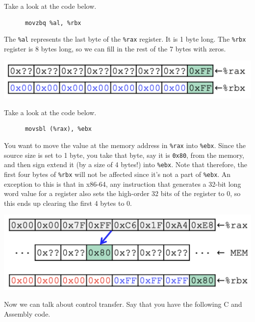   \begin{example}
    Take a look at the code below. 
    \begin{lstlisting}
      movzbq %al, %rbx
    \end{lstlisting}
    The \texttt{\%al} represents the last byte of the \texttt{\%rax} register. It is 1 byte long. The \texttt{\%rbx} register is 8 bytes long, so we can fill in the rest of the 7 bytes with zeros. 
    \begin{center}  
      \includegraphics[scale=0.5]{img/movzbq.png}
    \end{center}
  \end{example}

  \begin{example}
    Take a look at the code below. 
    \begin{lstlisting}
      movsbl (%rax), %ebx
    \end{lstlisting}
    You want to move the value at the memory address in \texttt{\%rax} into \texttt{\%ebx}. Since the source size is set to 1 byte, you take that byte, say it is \texttt{0x80}, from the memory, and then sign extend it (by a size of 4 bytes!) into \texttt{\%ebx}. Note that therefore, the first four bytes of \texttt{\%rbx} will not be affected since it's not a part of \texttt{\%ebx}. An exception to this is that in x86-64, any instruction that generates a 32-bit long word value for a register also sets the high-order 32 bits of the register to 0, so this ends up clearing the first 4 bytes to 0. 
    \begin{center}  
      \includegraphics[scale=0.5]{img/movsbl.png}
    \end{center}
  \end{example}

  Now we can talk about control transfer. Say that you have the following C and Assembly code. 
  
